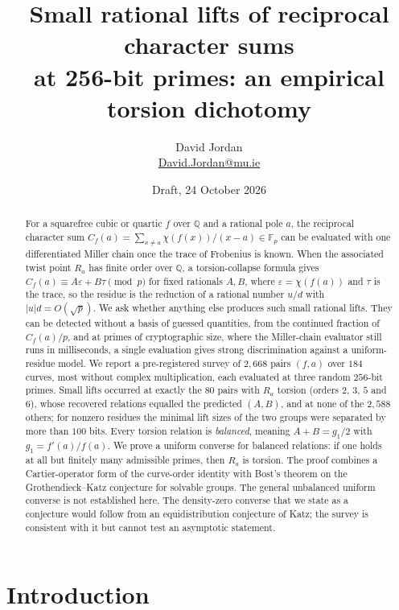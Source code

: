 \documentclass[11pt,a4paper]{article}
\title{Small rational lifts of reciprocal character sums\\ at 256-bit primes: an empirical torsion dichotomy}
\author{David Jordan\\[2pt]\small\href{mailto:David.Jordan@mu.ie}{David.Jordan@mu.ie}}
\date{Draft, 24 October 2026}
\numberwithin{equation}{section}
\theoremstyle{plain}
\theoremstyle{definition}
\newcommand{\F}{\mathbb{F}}
\newcommand{\Q}{\mathbb{Q}}
\newcommand{\eps}{\varepsilon}
\begin{document}
\maketitle

\begin{abstract}
For a squarefree cubic or quartic $f$ over $\Q$ and a rational pole $a$, the reciprocal character sum $C_f(a)=\sum_{x\neq a}\chi(f(x))/(x-a)\in\F_p$ can be evaluated with one differentiated Miller chain once the trace of Frobenius is known. When the associated twist point $R_a$ has finite order over $\Q$, a torsion-collapse formula gives $C_f(a)\equiv A\eps+B\tau\pmod p$ for fixed rationals $A,B$, where $\eps=\chi(f(a))$ and $\tau$ is the trace, so the residue is the reduction of a rational number $u/d$ with $|u|d=O(\sqrt p)$. We ask whether anything else produces such small rational lifts. They can be detected without a basis of guessed quantities, from the continued fraction of $C_f(a)/p$, and at primes of cryptographic size, where the Miller-chain evaluator still runs in milliseconds, a single evaluation gives strong discrimination against a uniform-residue model. We report a pre-registered survey of $2{,}668$ pairs $(f,a)$ over $184$ curves, most without complex multiplication, each evaluated at three random $256$-bit primes. Small lifts occurred at exactly the $80$ pairs with $R_a$ torsion (orders $2$, $3$, $5$ and $6$), whose recovered relations equalled the predicted $(A,B)$, and at none of the $2{,}588$ others; for nonzero residues the minimal lift sizes of the two groups were separated by more than $100$ bits. Every torsion relation is \emph{balanced}, meaning $A+B=g_1/2$ with $g_1=f'(a)/f(a)$. We prove a uniform converse for balanced relations: if one holds at all but finitely many admissible primes, then $R_a$ is torsion. The proof combines a Cartier-operator form of the curve-order identity with Bost's theorem on the Grothendieck--Katz conjecture for solvable groups. The general unbalanced uniform converse is not established here. The density-zero converse that we state as a conjecture would follow from an equidistribution conjecture of Katz; the survey is consistent with it but cannot test an asymptotic statement.
\end{abstract}

\section{Introduction}\label{sec:intro}
\end{document}
